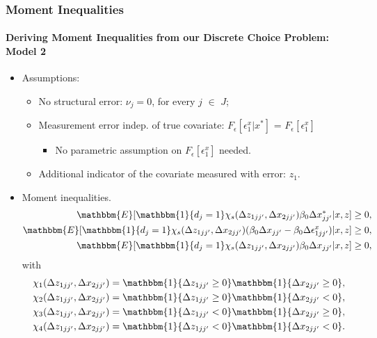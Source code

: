 \begin{frame}
\frametitle{Moment Inequalities}
\framesubtitle{Deriving Moment Inequalities from our Discrete Choice Problem: Model 2}

\begin{itemize}
	\item Assumptions:
	\begin{itemize}
		\item No structural error: $\nu_{j} = 0$, for every $j$ $\in$ $J$;
		\item Measurement error indep. of true covariate: $F_{\epsilon}[\epsilon^{x}_{1}|x^{*}]$ = $F_{\epsilon}[\epsilon^{x}_{1}]$
		\begin{itemize}
			\item No parametric assumption on $F_{\epsilon}[\epsilon^{x}_{1}]$ needed.
		\end{itemize}
		\item Additional indicator of the covariate measured with error: $z_{1}$.
	\end{itemize}
	\item Moment inequalities.
	\begin{align*}
	\mathbbm{E}[\mathbbm{1}\{d_{j}=1\}\chi_{s}(\Delta z_{1jj'},\Delta x_{2jj'})\beta_{0}\Delta x^{*}_{jj'}|x,z]&\geq 0,\\
	\mathbbm{E}[\mathbbm{1}\{d_{j}=1\}\chi_{s}(\Delta z_{1jj'},\Delta x_{2jj'})(\beta_{0}\Delta x_{jj'}-\beta_{0}\Delta \epsilon^{x}_{1jj'})|x,z]&\geq 0,\\
	\mathbbm{E}[\mathbbm{1}\{d_{j}=1\}\chi_{s}(\Delta z_{1jj'},\Delta x_{2jj'})\beta_{0}\Delta x_{jj'}|x,z]&\geq 0,
	\end{align*}
	with
	\begin{align*}
	\chi_{1}(\Delta z_{1jj'},\Delta x_{2jj'}) &= \mathbbm{1}\{\Delta z_{1jj'}\geq 0\}\mathbbm{1}\{\Delta x_{2jj'}\geq 0\},\\
	\chi_{2}(\Delta z_{1jj'},\Delta x_{2jj'}) &= \mathbbm{1}\{\Delta z_{1jj'}\geq 0\}\mathbbm{1}\{\Delta x_{2jj'}<0\},\\
	\chi_{3}(\Delta z_{1jj'},\Delta x_{2jj'}) &= \mathbbm{1}\{\Delta z_{1jj'}<0\}\mathbbm{1}\{\Delta x_{2jj'}\geq 0\},\\
	\chi_{4}(\Delta z_{1jj'},\Delta x_{2jj'}) &= \mathbbm{1}\{\Delta z_{1jj'}<0\}\mathbbm{1}\{\Delta x_{2jj'}<0\}.
	\end{align*}
\end{itemize}
\end{frame}
